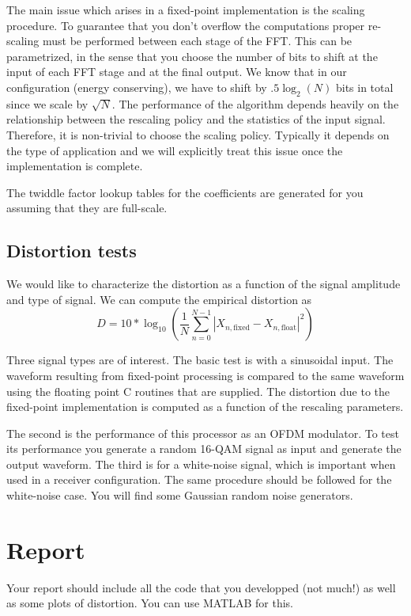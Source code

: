 \documentclass[11pt]{article}
\begin{document}
The main issue which arises in a fixed-point implementation is the scaling procedure.  To guarantee that you don't overflow
the computations proper re-scaling must be performed between each stage of the FFT.  This can be parametrized, in the sense that you choose
the number of bits to shift at the input of each FFT stage and at the final output. We know that in our configuration (energy conserving),
we have to shift by $.5\log_2(N)$ bits in total since we scale by $\sqrt{N}$.    The performance
of the algorithm depends heavily on the relationship between the rescaling policy and the statistics of the input signal.  Therefore,
it is non-trivial to choose the scaling policy.  Typically it depends on the type of application and we will explicitly treat this issue 
once the implementation is complete.

The twiddle factor lookup tables for the coefficients are generated for you assuming that they are full-scale. 



\subsection{Distortion tests}
We would like to characterize the distortion as a function of the signal amplitude and type of signal.  We can compute the empirical distortion as
\begin{equation}
D = 10*\log_{10}\left(\frac{1}{N}\sum_{n=0}^{N-1}|X_{n,\mathrm{fixed}}- X_{n,\mathrm{float}}|^2\right)
\end{equation}
  
Three signal types are of interest.  The basic test is with a sinusoidal input. The waveform resulting from fixed-point processing is compared 
to the same waveform using the floating point C routines that are supplied.  The distortion due to the fixed-point implementation 
is computed as a function of the rescaling parameters.

The second is the performance of this processor as an OFDM modulator. To test its performance you generate a
random 16-QAM signal as input and generate the output waveform.    The third is for a white-noise signal, 
which is important when used in a receiver configuration.  The same procedure should be followed for the 
white-noise case. You will find some Gaussian random noise generators.  

\section{Report}
Your report should include all the code that you developped (not much!) as well as some plots of distortion. You can use MATLAB for this. 
\end{document}

